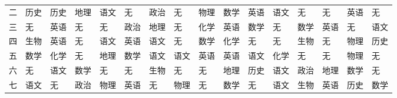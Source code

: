 \documentclass[bwprint]{cumcmthesis}
\begin{document}
\begin{landscape}
\begin{longtable}{llllllllllllllll}
		二     & 历史    & 历史    & 地理    & 语文    & 无     & 政治    & 无     & 物理    & 数学    & 英语    & 语文    & 无     & 无     & 英语    & 无 \\
		三     & 无     & 英语    & 无     & 无     & 政治    & 地理    & 无     & 化学    & 英语    & 数学    & 无     & 数学    & 英语    & 无     & 语文 \\
		四     & 生物    & 英语    & 无     & 语文    & 英语    & 语文    & 无     & 数学    & 化学    & 无     & 无     & 生物    & 无     & 物理    & 历史 \\
		五     & 数学    & 化学    & 无     & 地理    & 数学    & 语文    & 语文    & 英语    & 英语    & 语文    & 化学    & 无     & 无     & 物理    & 无 \\
		六     & 无     & 语文    & 数学    & 无     & 无     & 生物    & 无     & 无     & 地理    & 历史    & 语文    & 政治    & 地理    & 数学    & 无 \\
		七     & 语文    & 无     & 政治    & 物理    & 英语    & 无     & 物理    & 无     & 数学    & 无     & 语文    & 生物    & 英语    & 历史    & 数学 \\
		\bottomrule
	\end{longtable}%
\end{landscape}
	








\newpage
\appendix
\end{document}
